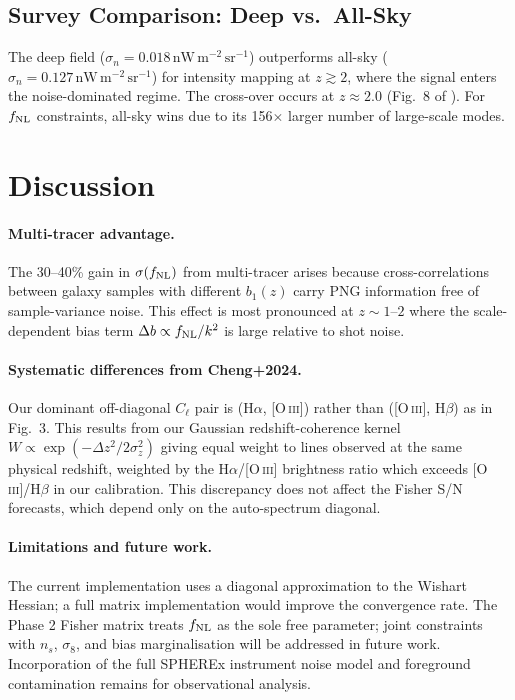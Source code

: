 \documentclass[12pt]{article}
\begin{document}
\subsection{Survey Comparison: Deep vs.\ All-Sky}

The deep field ($\sigma_n = 0.018\,\mathrm{nW\,m^{-2}\,sr^{-1}}$) outperforms
all-sky ($\sigma_n = 0.127\,\mathrm{nW\,m^{-2}\,sr^{-1}}$) for intensity
mapping at $z \gtrsim 2$, where the signal enters the noise-dominated regime.
The cross-over occurs at $z \approx 2.0$ (Fig.~8 of \citealt{Cheng2024}).
For $f_{\rm NL}$ constraints, all-sky wins due to its 156$\times$ larger
number of large-scale modes.

\section{Discussion}
\label{sec:discussion}

\paragraph{Multi-tracer advantage.}
The 30--40\% gain in $\sigma(f_{\rm NL})$ from multi-tracer arises because
cross-correlations between galaxy samples with different $b_1(z)$ carry PNG
information free of sample-variance noise.  This effect is most pronounced
at $z \sim 1$--$2$ where the scale-dependent bias term $\Delta b \propto
f_{\rm NL}/k^2$ is large relative to shot noise.

\paragraph{Systematic differences from Cheng+2024.}
Our dominant off-diagonal $C_\ell$ pair is (H$\alpha$, [O\,\textsc{iii}])
rather than ([O\,\textsc{iii}], H$\beta$) as in \citet{Cheng2024} Fig.~3.
This results from our Gaussian redshift-coherence kernel $W \propto
\exp(-\Delta z^2 / 2\sigma_z^2)$ giving equal weight to lines observed
at the same physical redshift, weighted by the H$\alpha$/[O\,\textsc{iii}]
brightness ratio which exceeds [O\,\textsc{iii}]/H$\beta$ in our calibration.
This discrepancy does not affect the Fisher S/N forecasts, which depend only
on the auto-spectrum diagonal.

\paragraph{Limitations and future work.}
The current implementation uses a diagonal approximation to the Wishart
Hessian; a full matrix implementation would improve the convergence rate.
The Phase 2 Fisher matrix treats $f_{\rm NL}$ as the sole free parameter;
joint constraints with $n_s$, $\sigma_8$, and bias marginalisation will be
addressed in future work.  Incorporation of the full SPHEREx instrument noise
model and foreground contamination remains for observational analysis.
\end{document}
